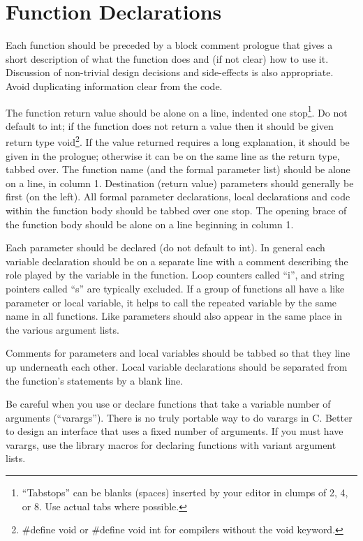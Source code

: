 \section{Function Declarations}

 Each function should be preceded by a block comment prologue that gives a
short description of what the function does and (if not clear) how to use it.
Discussion of non-trivial design decisions and side-effects is also
appropriate. Avoid duplicating information clear from the code. 

 The function return value should be alone on a line, indented one
stop\footnote{``Tabstops'' can be blanks (spaces) inserted by your editor
in clumps of 2, 4, or 8. Use actual tabs where possible.}. Do
not default to int; if the function does not return a value then
it should be given return type void\footnote
{\#define void or \#define void int for compilers without the void
keyword.}. If the value returned requires a long explanation,
it should be given in the prologue; otherwise it can be on the same line as the
return type, tabbed over. The function name (and the formal parameter list)
should be alone on a line, in column 1. Destination (return value) parameters
should generally be first (on the left). All formal parameter declarations,
local declarations and code within the function body should be tabbed over one
stop. The opening brace of the function body should be alone on a line
beginning in column 1. 

 Each parameter should be declared (do not default to int). In general each
variable declaration should be on a separate line with a comment describing the
role played by the variable in the function. Loop counters called ``i'', and
string pointers called ``s'' are typically excluded. If a group of functions
all have a like parameter or local variable, it helps to call the repeated
variable by the same name in all functions. Like parameters should also appear
in the same place in the various argument lists. 

 Comments for parameters and local variables should be tabbed so that they line
up underneath each other. Local variable declarations should be separated
from the function's statements by a blank line. 

 Be careful when you use or declare functions that take a variable number of
arguments (``varargs''). There is no truly portable way to do varargs in C.
Better to design an interface that uses a fixed number of arguments. If you
must have varargs, use the library macros for declaring functions with variant
argument lists. 

